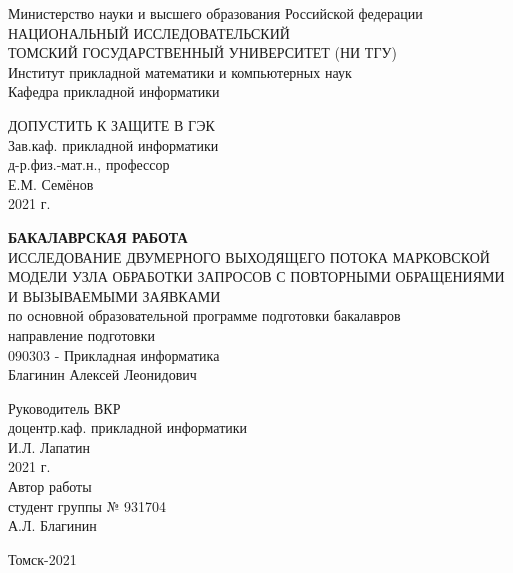 	\begin{center}\linespread{1}
		\hfill \break
		\large{Министерство науки и высшего образования Российской федерации}\\
		\footnotesize{НАЦИОНАЛЬНЫЙ ИССЛЕДОВАТЕЛЬСКИЙ}\\ 
		\footnotesize{ТОМСКИЙ ГОСУДАРСТВЕННЫЙ УНИВЕРСИТЕТ (НИ ТГУ)}\\
		\footnotesize{Институт прикладной математики и компьютерных наук}\\
		\footnotesize{Кафедра прикладной информатики}\\
		\hfill\break
		\hfill \break
		\hfill \break
	\end{center}
\begin{flushright}\linespread{0.9}
	\normalsize{ДОПУСТИТЬ К ЗАЩИТЕ В ГЭК}\\ 
	\hfill \break
	\normalsize{ 
			Зав.каф. прикладной информатики\\  д-р.физ.-мат.н.,  профессор\\ \underline{\hspace{2cm}} Е.М. Семёнов\\
			\textquote{\underline{\hspace{0.7cm}}}\underline{\hspace{2cm}}2021 г.		
	}\\
\end{flushright}
\hfill \break
\hfill \break
\begin{center}\linespread{1}
		\large\textbf{ БАКАЛАВРСКАЯ РАБОТА}\\
		\hfill \break
		\large{ИССЛЕДОВАНИЕ ДВУМЕРНОГО ВЫХОДЯЩЕГО ПОТОКА МАРКОВСКОЙ МОДЕЛИ УЗЛА ОБРАБОТКИ ЗАПРОСОВ С ПОВТОРНЫМИ ОБРАЩЕНИЯМИ И ВЫЗЫВАЕМЫМИ ЗАЯВКАМИ}\\
		\hfill \break
		\hfill \break
		\normalsize{по основной образовательной программе подготовки бакалавров\\
			направление  подготовки\\
			090303 - Прикладная информатика\\
		\hfill \break
	Благинин Алексей Леонидович}\\
		\hfill \break
		\hfill \break
	\end{center}
\begin{flushright}\linespread{0.9}
	\normalsize{ 
		Руководитель ВКР\\
		 доцентр.каф. прикладной информатики\\ \underline{\hspace{2cm}} И.Л. Лапатин\\
		 \textquote{\underline{\hspace{0.7cm}}}\underline{\hspace{2cm}}2021 г.\\
		 \hfill \break
		  Автор работы\\
		  студент группы № 931704\\ \underline{\hspace{2cm}} А.Л. Благинин	
	}\\
\end{flushright}
	\hfill \break
	\hfill \break
	\begin{center} Томск-2021 \end{center}
	\thispagestyle{empty} %
	\clearpage
